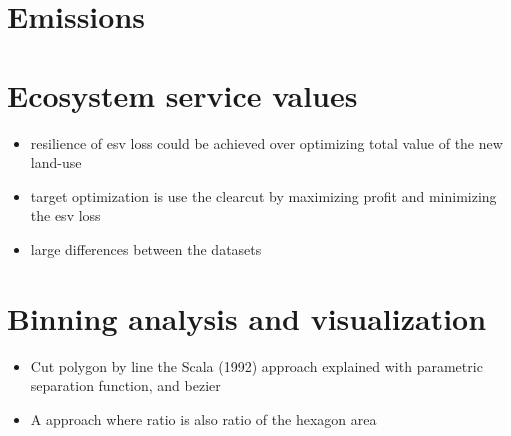 	\section{Emissions}

	\section{Ecosystem service values}
		\begin{itemize}
			\item resilience of esv loss could be achieved over optimizing total value of the new land-use
			\item target optimization is use the clearcut by maximizing profit and minimizing the esv loss
			\item large differences between the datasets
		\end{itemize}

	\section{Binning analysis and visualization}
		\begin{itemize}
			\item Cut polygon by line the Scala (1992) approach explained with parametric separation function, and bezier
			\item A approach where ratio is also ratio of the hexagon area
		\end{itemize}

